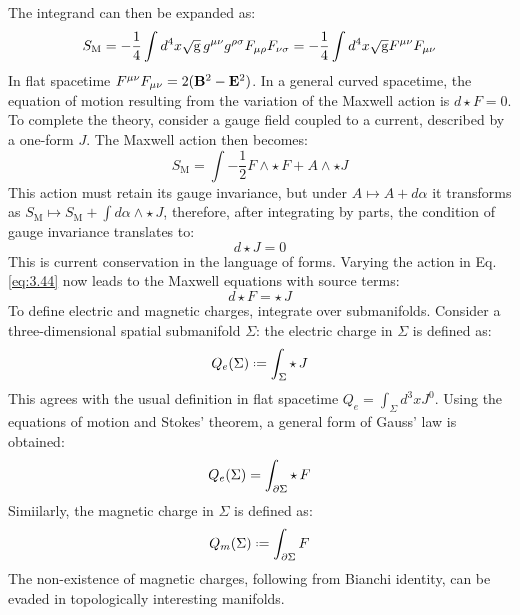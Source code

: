 The integrand can then be expanded as:
\begin{equation*}
  S_{\text{M}} = - \frac{1}{4} \int d^4 x \sqrt{\mathrm{g}}\, g^{\mu \nu} g^{\rho \sigma} F_{\mu \rho} F_{\nu \sigma} = - \frac{1}{4} \int d^4 x \sqrt{\mathrm{g}} F^{\mu \nu} F_{\mu \nu}
\end{equation*}
In flat spacetime $ F^{\mu \nu} F_{\mu \nu} = 2 (\mathbf{B}^2 - \mathbf{E}^2) $. In a general curved spacetime, the equation of motion resulting from the variation of the Maxwell action is $ d \star F = 0 $.\\
To complete the theory, consider a gauge field coupled to a current, described by a one-form $ J $. The Maxwell action then becomes:
\begin{equation}
  S_{\text{M}} = \int - \frac{1}{2} F \wedge \star\, F + A \wedge \star J
  \label{eq:3.45}
\end{equation}
This action must retain its gauge invariance, but under $ A \mapsto A + d\alpha $ it transforms as $ S_{\text{M}} \mapsto S_{\text{M}} + \int d\alpha \wedge \star\, J $, therefore, after integrating by parts, the condition of gauge invariance translates to:
\begin{equation}
  d \star J = 0
  \label{eq:3.46}
\end{equation}
This is current conservation in the language of forms. Varying the action in Eq. \ref{eq:3.44} now leads to the Maxwell equations with source terms:
\begin{equation}
  d \star F = \star\, J
  \label{eq:3.47}
\end{equation}
To define electric and magnetic charges, integrate over submanifolds. Consider a three-dimensional spatial submanifold $ \Sigma $: the electric charge in $ \Sigma $ is defined as:
\begin{equation}
  Q_e(\Sigma) \defeq \int_{\Sigma} \star\, J
  \label{eq:3.48}
\end{equation}
This agrees with the usual definition in flat spacetime $ Q_e = \int_{\Sigma} d^3 x J^0 $. Using the equations of motion and Stokes' theorem, a general form of Gauss' law is obtained:
\begin{equation}
  Q_e(\Sigma) = \int_{\partial \Sigma} \star\, F
  \label{eq:3.49}
\end{equation}
Simiilarly, the magnetic charge in $ \Sigma $ is defined as:
\begin{equation}
  Q_m(\Sigma) \defeq \int_{\pa \Sigma} F
  \label{eq:3.50}
\end{equation}
The non-existence of magnetic charges, following from Bianchi identity, can be evaded in topologically interesting manifolds.\\
